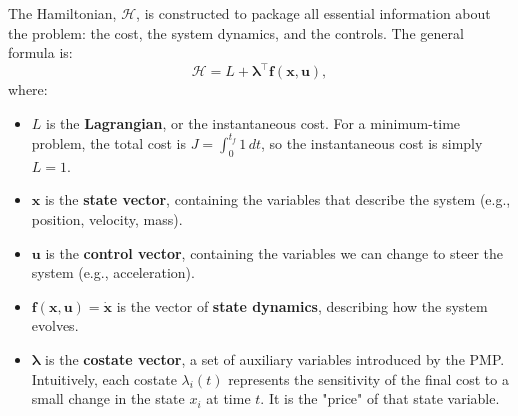 \documentclass[journal, a4paper]{IEEEtran}
\begin{document}
The Hamiltonian, $\mathcal{H}$, is constructed to package all essential information about the problem: the cost, the system dynamics, and the controls. The general formula is:
\begin{equation}
    \mathcal{H} = L + \boldsymbol{\lambda}^\top \mathbf{f}(\mathbf{x}, \mathbf{u}),
    \label{eq:hamiltonian_general}
\end{equation}
where:
\begin{itemize}
    \item $L$ is the \textbf{Lagrangian}, or the instantaneous cost. For a minimum-time problem, the total cost is $J = \int_0^{t_f} 1 \, dt$, so the instantaneous cost is simply $L=1$.
    \item $\mathbf{x}$ is the \textbf{state vector}, containing the variables that describe the system (e.g., position, velocity, mass).
    \item $\mathbf{u}$ is the \textbf{control vector}, containing the variables we can change to steer the system (e.g., acceleration).
    \item $\mathbf{f}(\mathbf{x}, \mathbf{u}) = \dot{\mathbf{x}}$ is the vector of \textbf{state dynamics}, describing how the system evolves.
    \item $\boldsymbol{\lambda}$ is the \textbf{costate vector}, a set of auxiliary variables introduced by the PMP. Intuitively, each costate $\lambda_i(t)$ represents the sensitivity of the final cost to a small change in the state $x_i$ at time $t$. It is the "price" of that state variable.
\end{itemize}
\end{document}
